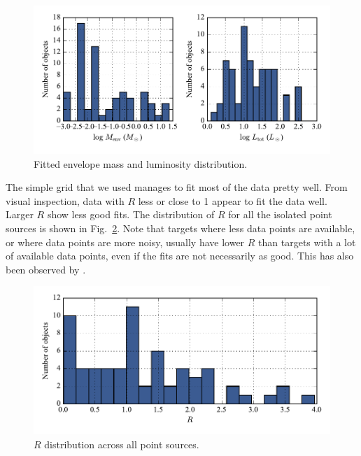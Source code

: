 \begin{figure}[!h]
\begin{center}
\includegraphics[width=\textwidth]{Figures/MassLumHist.pdf}
\vspace{-1cm}
\caption[Fitted envelope mass and luminosity distribution]{Fitted envelope mass and luminosity distribution.}
\label{fig:MassLumHist}
\end{center}
\end{figure}

The simple grid that we used manages to fit most of the data pretty well. From visual inspection, data with $R$ less or close to 1 appear to fit the data well. Larger $R$ show less good fits. The distribution of $R$ for all the isolated point sources is shown in Fig.~\ref{fig:Rdistr}. Note that targets where less data points are available, or where data points are more noisy, usually have lower $R$ than targets with a lot of available data points, even if the fits are not necessarily as good. This has also been observed by \citep{Furlan:2016df}.

\begin{figure}[!h]
\begin{center}
\includegraphics[width=\textwidth]{Figures/Rdistr.pdf}
\vspace{-1cm}
\caption[Distribution of $R$]{$R$ distribution across all point sources.}
\label{fig:Rdistr}
\end{center}
\end{figure}


